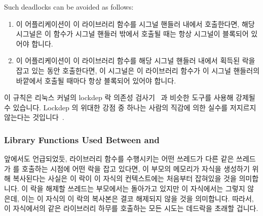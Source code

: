 Such deadlocks can be avoided as follows:

\fi

\begin{enumerate}
\item	이 어플리케이션이 이 라이브러리 함수를 시그널 핸들러 내에서 호출한다면,
	해당 시그널은 이 함수가 시그널 핸들러 밖에서 호출될 때는 항상 시그널이
	블록되어 있어야 합니다.
\item	이 어플리케이션이 이 라이브러리 함수를 해당 시그널 핸들러 내에서 획득된
	락을 잡고 있는 동안 호출한다면, 이 시그널은 이 라이브러리 함수가 이
	시그널 핸들러의 바깥에서 호출될 때마다 항상 블록되어 있어야 합니다.

\end{enumerate}

이 규칙은 리눅스 커널의 lockdep 락 의존성
검사기~\cite{JonathanCorbet2006lockdep} 과 비슷한 도구를 사용해 강제될 수
있습니다.
Lockdep 의 위대한 강점 중 하나는 사람의 직감에 의한 실수를 저지르지 않는다는
것입니다~\cite{StevenRostedt2011locdepCryptic}.

\subsubsection{Library Functions Used Between  and }
\label{sec:locking:Library Functions Used Between fork() and exec()}

앞에서도 언급되었듯, 라이브러리 함수를 수행시키는 어떤 쓰레드가 다른 같은
쓰레드가  를 호출하는 시점에 어떤 락을 잡고 있다면, 이 부모의
메모리가 자식을 생성하기 위해 복사된다는 사실은 이 락이 이 자식의 컨텍스트에는
처음부터 잡혀있을 것을 의미합니다.
이 락을 해제할 쓰레드는 부모에서는 돌아가고 있지만 이 자식에서는 그렇지 않은데,
이는 이 자식의 이 락의 복사본은 결코 해제되지 않을 것을 의미합니다.
따라서, 이 자식에서의 같은 라이브러리 하무를 호출하는 모든 시도는 데드락을
초래할 겁니다.

